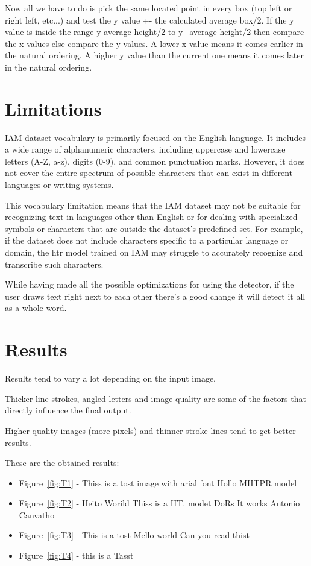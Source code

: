 Now all we have to do is pick the same located point in every box (top left or right left, etc...) and test the y value +- the calculated average box/2. If the y value is inside the range y-average height/2 to y+average height/2 then compare the x values else compare the y values. A lower x value means it comes earlier in the natural ordering. A higher y value than the current one means it comes later in the natural ordering. 

\section{Limitations}
IAM dataset vocabulary is primarily focused on the English language. It includes a wide range of alphanumeric characters, including uppercase and lowercase letters (A-Z, a-z), digits (0-9), and common punctuation marks. However, it does not cover the entire spectrum of possible characters that can exist in different languages or writing systems.

This vocabulary limitation means that the IAM dataset may not be suitable for recognizing text in languages other than English or for dealing with specialized symbols or characters that are outside the dataset's predefined set. For example, if the dataset does not include characters specific to a particular language or domain, the \gls{htr} model trained on IAM may struggle to accurately recognize and transcribe such characters.

While having made all the possible optimizations for using the detector, if the user draws text right next to each other there's a good change it will detect it all as a whole word.

\section{Results}
Results tend to vary a lot depending on the input image. 

Thicker line strokes, angled letters and image quality are some of the factors that directly influence the final output.

Higher quality images (more pixels) and thinner stroke lines tend to get better results.

These are the obtained results:
\begin{itemize}
	\item Figure~\ref{fig:T1} - Thiss is a tost image with arial font Hollo MHTPR model
	\item Figure~\ref{fig:T2} - Heito Worild Thiss is a HT. modet DoRs It works Antonio Canvatho
	\item Figure~\ref{fig:T3} - This is a tost Mello world Can you read thist 
	\item Figure~\ref{fig:T4} - this is a Tasst
\end{itemize} 

